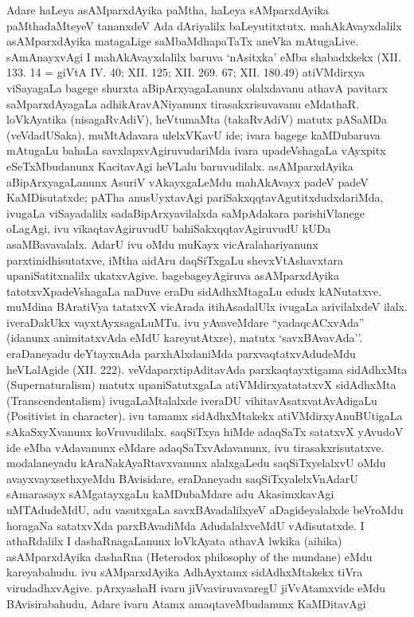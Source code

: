 Adare haLeya asAMparxdAyika paMtha, haLeya sAMparxdAyika paMtha\-daMteyeV tananxdeV Ada dAriyalilx baLeyutitxtutx. mahAkAvayxdalilx asAMparxdAyika matagaLige saMbaMdhapaTaTx aneVka mAtugaLive. sAmAnayxvAgi I mahAkAvayxdalilx baruva `nAsitxka' eMba shabadxkekx {\rm(XII. 133. 14 =} giVtA {\rm IV. 40; XII. 125; XII. 269. 67; XII. 180.49)} atiVMdirxya viSayagaLa bagege shurxta aBipArxya\-gaLanunx olalx\-davanu athavA pavitarx saMparxdAyagaLa adhikAravANiyanunx tirasakxrisuvavanu eMdathaR. loVkAyatika (nisagaRvAdiV), heVtumaMta (takaRvAdiV) matutx pASaMDa (veVdadUSaka), muMtAdavara ulelxVKavU ide; ivara bagege kaMDu\-baruva mAtugaLu bahaLa savxlapxvAgiruvudariMda ivara upadeVshagaLa vAyxpitx eSeTxMbu\-danunx KacitavAgi heVLalu baruvudilalx. asAMparxdAyika aBipArxyagaLanunx AsuriV vAkayxgaLeMdu mahAkAvayx padeV padeV KaMDisutatxde; pATha anusUyxtavAgi pariSakxqqta\-vAgutitxdudxdariMda, ivugaLa viSayadalilx sadaBipArxyavilalxda saMpAdakara parishiVlanege oLagAgi, ivu vikaqtavAgiruvudU bahiSakxqqtavAgiruvudU kUDa asaMBavavalalx. AdarU ivu oMdu muKayx vicAralahariyanunx parxtinidhisutatxve, iMtha aidAru daqSiTxgaLu shevxVtAshavxtara upaniSatitxnalilx ukatxvAgive. bagebageyAgiruva asAMparxdAyika tatotxvXpadeVshagaLa naDuve eraDu sidAdhxMtagaLu edudx kANutatxve. muMdina BAratiVya tatatxvX vicArada itihAsadalUlx ivugaLa arivilalxdeV ilalx. iveraDakUkx vayxtAyxsagaLuMTu. ivu yAvaveMdare ``yadaqcACxvAda'' (idanunx animitatxvAda eMdU kareyutAtxre), matutx `savxBAvavAda''. eraDaneyadu deYtayxnAda parxhAlxdaniMda parxvaqtatxvAdudeMdu heVLalAgide {\rm(XII. 222).} veVdaparxtipAditavAda parxkaqtayxtigama sidAdhxMta {\rm(Supernaturalism)} matutx upaniSatutxgaLa atiVMdirxyatatatxvX sidAdhxMta {\rm(Transcendentalism)} ivugaLaMtalalxde iveraDU vihitavAsatxvatAvAdigaLu {\rm(Positivist in character)}. ivu tamamx sidAdhxMtakekx atiVMdirxyAnuBUtigaLa sAkaSxyXvanunx koVruvudilalx. saqSiTxya hiMde adaqSaTx satatxvX yAvudoV ide eMba vAdavanunx eMdare adaqSaTxvAdavanunx, ivu tirasakxrisutatxve. modalaneyadu kAraNakAyaRtavxvanunx alalxgaLedu saqSiTxyelalxvU oMdu avayxvayxsethxyeMdu BAvisidare, eraDaneyadu saqSiTxyalelxVnAdarU sAmarasayx sAMgatayxgaLu kaMDubaMdare adu AkasimxkavAgi uMTAdudeMdU, adu vasutxgaLa savxBAvadalilxyeV aDagideyalalxde beVroMdu horagaNa satatxvXda parxBAvadiMda AdudalalxveMdU vAdisutatxde. I athaRdalilx I dashaRnagaLanunx loVkAyata athavA lwkika (aihika) asAMparxdAyika dashaRna {\rm(Heterodox philosophy of the mundane)} eMdu kareyabahudu. ivu sAMparxdAyika AdhAyxtamx sidAdhxMtakekx tiVra virudadhxvAgive. pArxyashaH ivaru jiVvaviruvavaregU jiVvAtamxvide eMdu BAvisirabahudu, Adare ivaru Atamx amaqtaveMbudanunx KaMDitavAgi 